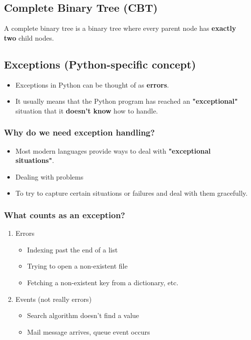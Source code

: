 \documentclass[11pt]{article}
\begin{document}
\subsection{Complete Binary Tree (CBT)}
\label{sec:org4294fb6}
A complete binary tree is a binary tree where every parent node has \textbf{exactly two} child nodes.

\subsection{Exceptions (Python-specific concept)}
\label{sec:org5de83ec}
\begin{itemize}
\item Exceptions in Python can be thought of as \textbf{errors}.
\item It usually means that the Python program has reached an \textbf{"exceptional"} situation that it \textbf{doesn't know} how to handle.
\end{itemize}

\subsubsection{Why do we need exception handling?}
\label{sec:org20d3a49}
\begin{itemize}
\item Most modern languages provide ways to deal with \textbf{"exceptional situations"}.
\item Dealing with problems
\item To try to capture certain situations or failures and deal with them gracefully.
\end{itemize}

\subsubsection{What counts as an exception?}
\label{sec:org5993695}
\begin{enumerate}
\item Errors
\begin{itemize}
\item Indexing past the end of a list
\item Trying to open a non-existent file
\item Fetching a non-existent key from a dictionary, etc.
\end{itemize}

\item Events (not really errors)
\begin{itemize}
\item Search algorithm doesn't find a value
\item Mail message arrives, queue event occurs
\end{itemize}
\end{enumerate}
\end{document}
